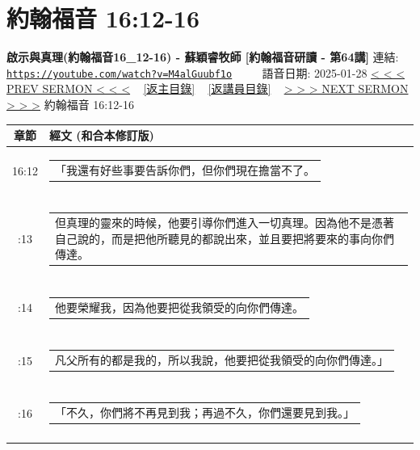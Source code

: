 \documentclass{book}
\begin{document}
\section{約翰福音 16:12-16}
\label{sec:M4alGuubf1o}
\textbf{啟示與真理(約翰福音16\_12-16) - 蘇穎睿牧師 [約翰福音研讀 - 第64講]}
\newline
\newline
連結: \href{https://youtube.com/watch?v=M4alGuubf1o}{\texttt{https://youtube.com/watch?v=M4alGuubf1o}} ~~~~ 語音日期: 2025-01-28
\newline
\newline
\hyperref[sec:pF1FrHKEPww]{< < < PREV SERMON < < <}
~
\hyperlink{toc}{[返主目錄]}
~
\hyperref[ch:preacher10]{[返講員目錄]}
~
\hyperref[sec:HaGDtN4u47U]{> > > NEXT SERMON > > >}
\newline
\newline
約翰福音 16:12-16
\newline
\begin{longtable}{cl}
\hline
\hline
章節 & 經文 (和合本修訂版)\\
\hline
16:12 & \begin{tabularx}{0.7\textwidth}{X} 「我還有好些事要告訴你們，但你們現在擔當不了。 \end{tabularx} \\ \\ \relax
16:13 & \begin{tabularx}{0.7\textwidth}{X} 但真理的靈來的時候，他要引導你們進入一切真理。因為他不是憑著自己說的，而是把他所聽見的都說出來，並且要把將要來的事向你們傳達。 \end{tabularx} \\ \\ \relax
16:14 & \begin{tabularx}{0.7\textwidth}{X} 他要榮耀我，因為他要把從我領受的向你們傳達。 \end{tabularx} \\ \\ \relax
16:15 & \begin{tabularx}{0.7\textwidth}{X} 凡父所有的都是我的，所以我說，他要把從我領受的向你們傳達。」 \end{tabularx} \\ \\ \relax
16:16 & \begin{tabularx}{0.7\textwidth}{X} 「不久，你們將不再見到我；再過不久，你們還要見到我。」 \end{tabularx} \\ \\
[1ex]
\hline
\hline
\end{longtable}
\end{document}

